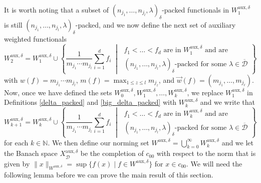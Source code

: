 \documentclass[12pt,a4paper]{amsart}
\newcommand{\N}{\mathbb{N}}
\newcommand{\bes}{\begin{equation*}}
\newcommand{\ees}{\end{equation*}}
\theoremstyle{definition}
\theoremstyle{plain}
\begin{document}
It is worth noting that a subset of $(n_{j_{1}},\ldots,n_{j_{l}},\lambda)_{\delta}$-packed functionals in $W^{\text{aux},\delta}_{1}$ is still $(n_{j_{1}},\ldots,n_{j_{l}},\lambda)_{\delta}$-packed, and we now define the next set of auxiliary weighted functionals
\bes W^{\text{aux},\delta}_{2}=W^{\text{aux},\delta}_{1}\cup\left\{ \frac{1}{m_{j_{1}}\cdots m_{j_{l}}}\sum_{i=1}^{d}f_{i} \;\middle\vert\; \substack{ f_{1}<\ldots<f_{d} \text{ are in } W^{\text{aux},\delta}_{1} \text{ and are} \\  (n_{j_{1}},\ldots,n_{j_{l}},\lambda)_{\delta}\text{-packed for some } \lambda\in\overline{\mathcal{D}}} \right\} \ees
with $w(f)=m_{j_{1}}\cdots m_{j_{l}}$, $m(f)=\max_{1\leq z\leq l}m_{j_{z}}$, and $\vec w(f) = (m_{j_1},\ldots,m_{j_\ell})$. Now, once we have defined the sets $W^{\text{aux},\delta}_{0},W^{\text{aux},\delta}_{1},\ldots,W^{\text{aux},\delta}_{k}$, we replace $W^{\text{aux},\delta}_{1}$ in Definitions \ref{delta_packed} and \ref{big_delta_packed} with $W^{\text{aux},\delta}_{k}$ and we write that
\bes W^{\text{aux},\delta}_{k+1}=W^{\text{aux},\delta}_{k}\cup\left\{ \frac{1}{m_{j_{1}}\cdots m_{j_{l}}}\sum_{i=1}^{d}f_{i} \;\middle\vert\; \substack{ f_{1}<\ldots<f_{d} \text{ are in } W^{\text{aux},\delta}_{k} \text{ and are} \\  (n_{j_{1}},\ldots,n_{j_{l}},\lambda)_{\delta}\text{-packed for some } \lambda\in\overline{\mathcal{D}}} \right\} \ees
for each $k\in\N$. We then define our norming set $W^{\text{aux},\delta}=\bigcup_{k=0}^{\infty}W^{\text{aux},\delta}_{k}$ and we let the Banach space $X_{\mathcal{D}}^{\text{aux},\delta}$ be the completion of $c_{00}$ with respect to the norm that is given by $\|x\|_{W^{\text{aux},\delta}}=\sup\{f(x) \mid f\in W^{\text{aux},\delta}\}$ for $x\in c_{00}$. We will need the following lemma before we can prove the main result of this section.
\end{document}
